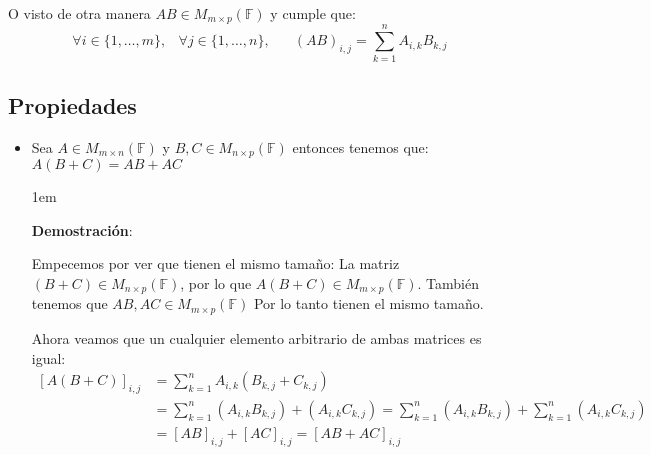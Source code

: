 \documentclass[12pt]{report}                                    %
\newenvironment{SmallIndentation}[1][0.75em]                    %
    {\begin{adjustwidth}{#1}{}\begin{footnotesize}}                 %
    {\end{footnotesize}\end{adjustwidth}}                           %
\DeclareMathOperator \Space {\quad}                             %
\DeclareMathOperator \MiniSpace {\;}                            %
\begin{document}
            O visto de otra manera $AB \in M_{m \times p}(\mathbb{F})$ y cumple que:
            \begin{equation}
                \forall i \in \{1, \dots, m\} ,\MiniSpace
                    \forall j \in \{1, \dots, n\} ,\Space
                        (AB)_{i, j} = \sum_{k=1}^{n} A_{i, k}B_{k, j}
            \end{equation}


            \clearpage
            \subsection{Propiedades}

                \begin{itemize}

                    \item Sea $A \in M_{m \times n}(\mathbb{F})$ y $B,C \in M_{n \times p}(\mathbb{F})$
                        entonces tenemos que:
                        $A(B+C) = AB+AC$

                        \begin{SmallIndentation}[1em]
                            \textbf{Demostración}:

                            Empecemos por ver que tienen el mismo tamaño:
                            La matriz $(B+C) \in M_{n \times p}(\mathbb{F})$, por lo que 
                            $A(B+C) \in M_{m \times p}(\mathbb{F})$.
                            También tenemos que $AB, AC \in M_{m \times p}(\mathbb{F})$
                            Por lo tanto tienen el mismo tamaño.

                            Ahora veamos que un cualquier elemento arbitrario de ambas matrices es igual:
                            \begin{equation*}
                            \begin{split}
                                [A(B+C)]_{i, j}    
                                    &= \sum_{k=1}^{n} A_{i, k}(B_{k, j}+C_{k, j})  \\            
                                    &= \sum_{k=1}^{n} (A_{i, k}B_{k, j}) + (A_{i, k}C_{k, j}) 
                                    = \sum_{k=1}^{n} (A_{i, k}B_{k, j}) + \sum_{k=1}^{n} (A_{i, k}C_{k, j}) \\
                                    &= [AB]_{i, j} + [AC]_{i, j} = [AB + AC]_{i, j} 
                            \end{split}
                            \end{equation*}


\end{SmallIndentation}
\end{itemize}
\end{document}
